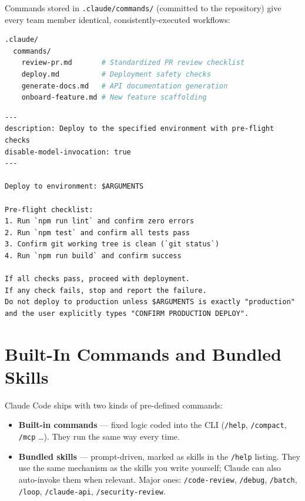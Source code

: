 
Commands stored in \texttt{.claude/commands/} (committed to the repository)
give every team member identical, consistently-executed workflows:

\begin{lstlisting}[language=bash,caption={Team command file layout}]
.claude/
  commands/
    review-pr.md       # Standardized PR review checklist
    deploy.md          # Deployment safety checks
    generate-docs.md   # API documentation generation
    onboard-feature.md # New feature scaffolding
\end{lstlisting}

\begin{lstlisting}[caption={A deployment command with safety guardrails}]
---
description: Deploy to the specified environment with pre-flight checks
disable-model-invocation: true
---

Deploy to environment: $ARGUMENTS

Pre-flight checklist:
1. Run `npm run lint` and confirm zero errors
2. Run `npm test` and confirm all tests pass
3. Confirm git working tree is clean (`git status`)
4. Run `npm run build` and confirm success

If all checks pass, proceed with deployment.
If any check fails, stop and report the failure.
Do not deploy to production unless $ARGUMENTS is exactly "production"
and the user explicitly types "CONFIRM PRODUCTION DEPLOY".
\end{lstlisting}

\section{Built-In Commands and Bundled Skills}
\label{sec:built-in-commands}


Claude Code ships with two kinds of pre-defined commands:

\begin{itemize}
  \item \textbf{Built-in commands} — fixed logic coded into the CLI
        (\texttt{/help}, \texttt{/compact}, \texttt{/mcp} \dots). They run
        the same way every time.
  \item \textbf{Bundled skills} — prompt-driven, marked as skills in the
        \texttt{/help} listing. They use the same mechanism as the skills
        you write yourself; Claude can also auto-invoke them when relevant.
        Major ones: \texttt{/code-review}, \texttt{/debug},
        \texttt{/batch}, \texttt{/loop}, \texttt{/claude-api},
        \texttt{/security-review}.
\end{itemize}

